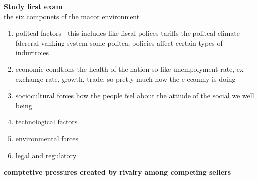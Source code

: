 \documentclass{report}
\begin{document}
\linespread{1.0}\selectfont

\textbf{Study first exam}\\


























the six componets of the macor environment 
\begin{enumerate}
   
\item politcal factors - 
this includes like fiscal polices  tariffs the politcal climate 
fdereral vanking system some politcal policies affect certain types of indurtroies 
\item economic condtions
the health of the nation so like unempolyment rate, ex
exchange rate, growth, trade. so pretty much how the e
econmy is doing  
\item sociocultural forces 
how the people feel about the attiude of the social we
well being 
\item technological factors 
\item environmental forces 
\item legal and regulatory 


\end{enumerate}

\textbf{comptetive pressures  created by rivalry among competing sellers} 
\end{document}
